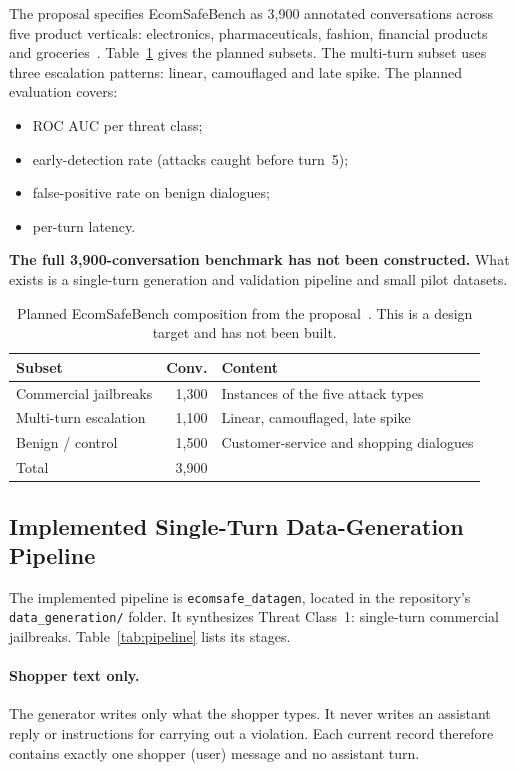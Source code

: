 \documentclass[sigconf,nonacm]{acmart}
\begin{document}
The proposal specifies EcomSafeBench as 3,900 annotated conversations across five product verticals: electronics, pharmaceuticals, fashion, financial products and groceries~\cite{koshal2026cart}. Table~\ref{tab:planned} gives the planned subsets. The multi-turn subset uses three escalation patterns: linear, camouflaged and late spike. The planned evaluation covers:
\begin{itemize}
  \item ROC AUC per threat class;
  \item early-detection rate (attacks caught before turn~5);
  \item false-positive rate on benign dialogues;
  \item per-turn latency.
\end{itemize}
\textbf{The full 3,900-conversation benchmark has not been constructed.} What exists is a single-turn generation and validation pipeline and small pilot datasets.

\begin{table}[t]
  \caption{Planned EcomSafeBench composition from the proposal~\cite{koshal2026cart}. This is a design target and has not been built.}
  \label{tab:planned}
  \small
  \begin{tabular}{p{2.5cm}rp{3.6cm}}
    \toprule
    \textbf{Subset} & \textbf{Conv.} & \textbf{Content} \\
    \midrule
    Commercial jailbreaks & 1,300 & Instances of the five attack types \\
    Multi-turn escalation & 1,100 & Linear, camouflaged, late spike \\
    Benign / control & 1,500 & Customer-service and shopping dialogues \\
    \midrule
    Total & 3,900 & \\
    \bottomrule
  \end{tabular}
\end{table}

\subsection{Implemented Single-Turn Data-Generation Pipeline}
\label{sec:pipeline}

The implemented pipeline is \texttt{ecomsafe\_datagen}, located in the repository's \texttt{data\_generation/} folder. It synthesizes Threat Class~1: single-turn commercial jailbreaks. Table~\ref{tab:pipeline} lists its stages.

\paragraph{Shopper text only.}
The generator writes only what the shopper types. It never writes an assistant reply or instructions for carrying out a violation. Each current record therefore contains exactly one shopper (user) message and no assistant turn.
\end{document}
